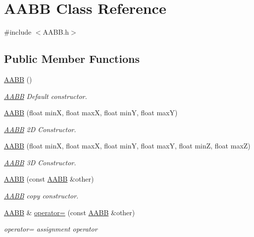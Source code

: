 \hypertarget{class_a_a_b_b}{}\section{A\+A\+BB Class Reference}
\label{class_a_a_b_b}


{\ttfamily \#include $<$A\+A\+B\+B.\+h$>$}

\subsection*{Public Member Functions}
\begin{DoxyCompactItemize}
\item 
\hyperlink{class_a_a_b_b_a5f5baf6c533905aa1456b3a3eb57bab2}{A\+A\+BB} ()
\begin{DoxyCompactList}\small\item\em \hyperlink{class_a_a_b_b}{A\+A\+BB} Default constructor. \end{DoxyCompactList}\item 
\hyperlink{class_a_a_b_b_a449705918e5ff246e37d1d2cdac6a404}{A\+A\+BB} (float minX, float maxX, float minY, float maxY)
\begin{DoxyCompactList}\small\item\em \hyperlink{class_a_a_b_b}{A\+A\+BB} 2D Constructor. \end{DoxyCompactList}\item 
\hyperlink{class_a_a_b_b_af123aa160ba288d95c3acb83448b57f4}{A\+A\+BB} (float minX, float maxX, float minY, float maxY, float minZ, float maxZ)
\begin{DoxyCompactList}\small\item\em \hyperlink{class_a_a_b_b}{A\+A\+BB} 3D Constructor. \end{DoxyCompactList}\item 
\hyperlink{class_a_a_b_b_a3f833137a852795f0ab1c9288b775ee6}{A\+A\+BB} (const \hyperlink{class_a_a_b_b}{A\+A\+BB} \&other)
\begin{DoxyCompactList}\small\item\em \hyperlink{class_a_a_b_b}{A\+A\+BB} copy constructor. \end{DoxyCompactList}\item 
\hyperlink{class_a_a_b_b}{A\+A\+BB} \& \hyperlink{class_a_a_b_b_a672a17a4a8ad2d0ea52ed7e73cd9a6a4}{operator=} (const \hyperlink{class_a_a_b_b}{A\+A\+BB} \&other)
\begin{DoxyCompactList}\small\item\em operator= assignment operator \end{DoxyCompactList}\item 

\end{DoxyCompactItemize}
